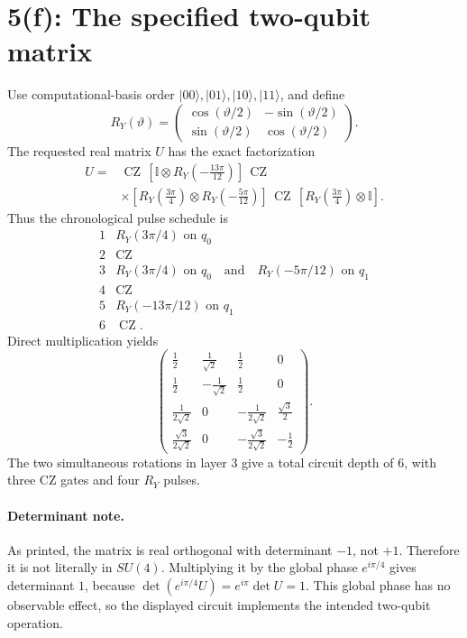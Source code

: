 \documentclass[11pt]{article}
\newcommand{\ket}[1]{\lvert #1\rangle}
\newcommand{\I}{\mathbb{I}}
\newcommand{\CZ}{\operatorname{CZ}}
\begin{document}
\section*{5(f): The specified two-qubit matrix}

Use computational-basis order
\(\ket{00},\ket{01},\ket{10},\ket{11}\), and define
\[
R_Y(\vartheta)=
\begin{pmatrix}
\cos(\vartheta/2)&-\sin(\vartheta/2)\\
\sin(\vartheta/2)&\cos(\vartheta/2)
\end{pmatrix}.
\]
The requested real matrix \(U\) has the exact factorization
\[
\boxed{
\begin{aligned}
U={}&
\CZ\,
\left[\I\otimes R_Y\left(-\frac{13\pi}{12}\right)\right]\,
\CZ\\
&\times
\left[R_Y\left(\frac{3\pi}{4}\right)
\otimes R_Y\left(-\frac{5\pi}{12}\right)\right]\,
\CZ\,
\left[R_Y\left(\frac{3\pi}{4}\right)\otimes\I\right].
\end{aligned}}
\]
Thus the chronological pulse schedule is
\[
\begin{array}{c|l}
1&R_Y(3\pi/4)\text{ on }q_0\\
2&\CZ\\
3&R_Y(3\pi/4)\text{ on }q_0
   \quad\text{and}\quad R_Y(-5\pi/12)\text{ on }q_1\\
4&\CZ\\
5&R_Y(-13\pi/12)\text{ on }q_1\\
6&\CZ .
\end{array}
\]
Direct multiplication yields
\[
\begin{pmatrix}
\frac12&\frac1{\sqrt2}&\frac12&0\\
\frac12&-\frac1{\sqrt2}&\frac12&0\\
\frac1{2\sqrt2}&0&-\frac1{2\sqrt2}&\frac{\sqrt3}{2}\\
\frac{\sqrt3}{2\sqrt2}&0&-\frac{\sqrt3}{2\sqrt2}&-\frac12
\end{pmatrix}.
\]
The two simultaneous rotations in layer \(3\) give a total circuit
depth of \(6\), with three CZ gates and four \(R_Y\) pulses.

\paragraph{Determinant note.}
As printed, the matrix is real orthogonal with determinant \(-1\), not
\(+1\). Therefore it is not literally in \(SU(4)\). Multiplying it by
the global phase \(e^{i\pi/4}\) gives determinant \(1\), because
\(\det(e^{i\pi/4}U)=e^{i\pi}\det U=1\). This global phase has no
observable effect, so the displayed circuit implements the intended
two-qubit operation.
\end{document}
